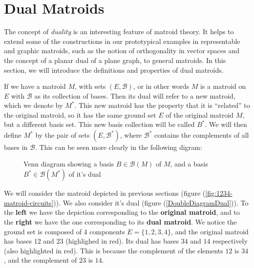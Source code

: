 \newpage
\section{Dual Matroids}
The concept of \textit{duality} is an interesting feature of matroid theory. It helps to extend some of the constructions in our prototypical examples in representable and graphic matroids, such as the notion of orthogonality in vector spaces and the concept of a planar dual of a plane graph, to general matroids. In this section, we will introduce the definitions and  properties of dual matroids.



If we have a matroid $M$, with sets $(E,\mathcal{B})$, or in other words $M$ is a matroid on $E$ with $\mathcal{B}$ as its collection of bases. Then its dual will refer to a new matroid, which we denote by $M^*$. This new matroid has the property that it is ``related'' to the original matroid, so it has the same ground set $E$ of the original matroid $M$, but a different basis set. This new basis collection will be called $B^*$. We will then define $M^*$ by the pair of sets $(E,\mathcal{B}^*)$, where $\mathcal{B}^*$ contains the complements of all bases in $\mathcal{B}$. This can be seen more clearly in the following digram:
\begin{figure}[H]
    \centering
{}
    \caption{Venn diagram showing a basis $B \in \mathcal B(M)$ of $M$, and a basis $B^* \in \mathcal B(M^*)$ of it's dual}%
\label{graphic}%
\end{figure}

We will consider the matroid depicted in previous sections (figure (\ref{fig:1234-matroid-circuits})). We also consider it's dual (figure (\ref{DoubleDiagramDual})). To the \textbf{left} we have the depiction corresponding to the \textbf{original matroid}, and to the \textbf{right} we have the one corresponding to its \textbf{dual matroid}. 
We notice the ground set is composed of 4 components $E=\{1,2,3,4\}$, and the original matroid has bases $12$ and $23$ (highlighed in red). Its dual has bases $34$ and $14$ respectively (also highlighted in red). This is because the complement of the elements $12$ is $34$, and the complement of $23$ is $14$.

